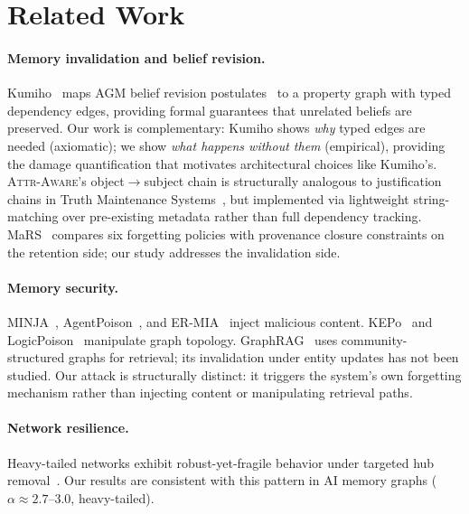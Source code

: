 \documentclass{article}
\newcommand{\attraware}{\textsc{Attr-Aware}}
\begin{document}
\section{Related Work}
\label{sec:related}

\paragraph{Memory invalidation and belief revision.}
Kumiho~\citep{kumiho_2026} maps AGM belief revision postulates~\citep{agm_1985} to a property graph with typed dependency edges, providing formal guarantees that unrelated beliefs are preserved.
Our work is complementary: Kumiho shows \textit{why} typed edges are needed (axiomatic); we show \textit{what happens without them} (empirical), providing the damage quantification that motivates architectural choices like Kumiho's.
\attraware{}'s object$\rightarrow$subject chain is structurally analogous to justification chains in Truth Maintenance Systems~\citep{doyle_tms_1979}, but implemented via lightweight string-matching over pre-existing metadata rather than full dependency tracking.
MaRS~\citep{mars_2025} compares six forgetting policies with provenance closure constraints on the retention side; our study addresses the invalidation side.

\paragraph{Memory security.}
MINJA~\citep{minja_2025}, AgentPoison~\citep{agentpoison_2024}, and ER-MIA~\citep{ermia_2026} inject malicious content.
KEPo~\citep{kepo_2026} and LogicPoison~\citep{logicpoison_2026} manipulate graph topology.
GraphRAG~\citep{edge_graphrag_2024} uses community-structured graphs for retrieval; its invalidation under entity updates has not been studied.
Our attack is structurally distinct: it triggers the system's own forgetting mechanism rather than injecting content or manipulating retrieval paths.

\paragraph{Network resilience.}
Heavy-tailed networks exhibit robust-yet-fragile behavior under targeted hub removal~\citep{albert_attack_2000, cohen_percolation_2000}.
Our results are consistent with this pattern in AI memory graphs ($\alpha \approx 2.7$--$3.0$, heavy-tailed).
\end{document}
